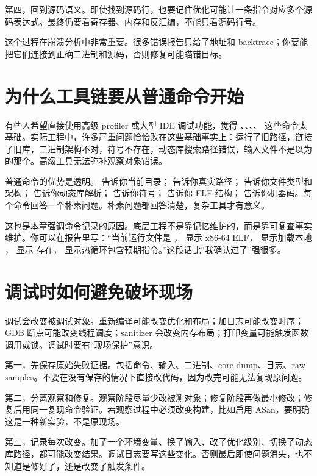 第四，回到源码语义。即使找到源码行，也要记住优化可能让一条指令对应多个源码表达式。最终仍要看寄存器、内存和反汇编，不能只看源码行号。

这个过程在崩溃分析中非常重要。很多错误报告只给了地址和 backtrace；你要能把它们连接到正确二进制和源码，否则修复可能瞄错目标。

\section{为什么工具链要从普通命令开始}

有些人希望直接使用高级 profiler 或大型 IDE 调试功能，觉得 、、、、 这些命令太基础。实际工程中，许多严重问题恰恰败在这些基础事实上：运行了旧路径，链接了旧库，二进制架构不对，符号不存在，动态库搜索路径错误，输入文件不是以为的那个。高级工具无法弥补观察对象错误。

普通命令的优势是透明。  告诉你当前目录； 告诉你真实路径； 告诉你文件类型和架构； 告诉你动态库解析； 告诉你符号； 告诉你 ELF 结构； 告诉你机器码。每个命令回答一个朴素问题。朴素问题都回答清楚，复杂工具才有意义。

这也是本章强调命令记录的原因。底层工程不是靠记忆维护的，而是靠可复查事实维护。你可以在报告里写：“当前运行文件是 ， 显示 x86-64 ELF， 显示加载本地 ， 显示  存在， 显示热循环包含预期指令。”这段话比“我确认过了”强很多。

\section{调试时如何避免破坏现场}

调试会改变被调试对象。重新编译可能改变优化和布局；加日志可能改变时序；GDB 断点可能改变线程调度；sanitizer 会改变内存布局；打印变量可能触发函数调用或锁。调试时要有“现场保护”意识。

第一，先保存原始失败证据。包括命令、输入、二进制、core dump、日志、raw samples。不要在没有保存的情况下直接改代码，因为改完可能无法复现原问题。

第二，分离观察和修复。观察阶段尽量少改被测对象；修复阶段再做最小修改；修复后用同一复现命令验证。若观察过程中必须改变构建，比如启用 ASan，要明确这是一种新实验，不是原现场。

第三，记录每次改变。加了一个环境变量、换了输入、改了优化级别、切换了动态库路径，都可能改变结果。调试日志要写这些变化。否则最后即使问题消失，也不知道是修好了，还是改变了触发条件。

